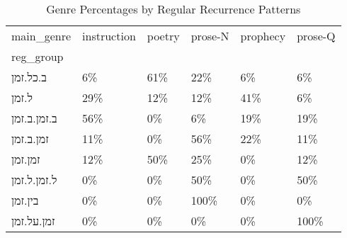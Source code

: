 \begin{table}[htbp!]
\centering
\caption{Genre Percentages by Regular Recurrence Patterns}
\label{table:regroup_gen_pc}
\begin{tabular}{llllll}
\toprule
main\_genre & instruction & poetry & prose-N & prophecy & prose-Q \\
reg\_group   &             &        &         &          &         \\
\midrule
ב.כל.זמן    &          6\% &    61\% &     22\% &       6\% &      6\% \\
ל.זמן       &         29\% &    12\% &     12\% &      41\% &      6\% \\
ב.זמן.ב.זמן &         56\% &     0\% &      6\% &      19\% &     19\% \\
זמן.ב.זמן   &         11\% &     0\% &     56\% &      22\% &     11\% \\
זמן.זמן     &         12\% &    50\% &     25\% &       0\% &     12\% \\
ל.זמן.ל.זמן &          0\% &     0\% &     50\% &       0\% &     50\% \\
בין.זמן     &          0\% &     0\% &    100\% &       0\% &      0\% \\
זמן.על.זמן  &          0\% &     0\% &      0\% &       0\% &    100\% \\
\bottomrule
\end{tabular}
\end{table}
